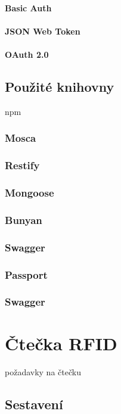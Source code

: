 \documentclass[czech,BP]{thesiskiv}
\begin{document}
		\subsubsection{Basic Auth}
		\subsubsection{JSON Web Token}
		\subsubsection{OAuth 2.0}
			
		
	\section{Použité knihovny}
		npm	
	
		\subsection{Mosca}
		\subsection{Restify}
		\subsection{Mongoose}
		\subsection{Bunyan}
		\subsection{Swagger}
		\subsection{Passport}
		\subsection{Swagger}
		
	
\chapter{Čtečka RFID}
	požadavky na čtečku

	\section{Sestavení}
\end{document}
